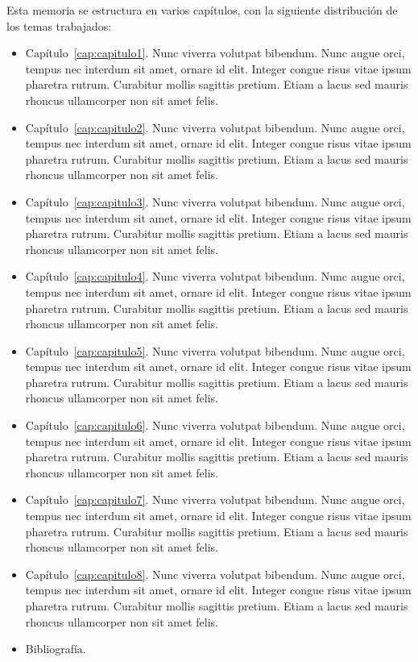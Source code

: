 Esta memoria se estructura en varios capítulos, con la siguiente distribución de los temas trabajados:

\begin{itemize}
	\item Capítulo~\ref{cap:capitulo1}. Nunc viverra volutpat bibendum. Nunc augue orci, tempus nec interdum sit amet, ornare id elit. Integer congue risus vitae ipsum pharetra rutrum. Curabitur mollis sagittis pretium. Etiam a lacus sed mauris rhoncus ullamcorper non sit amet felis.
	\item Capítulo~\ref{cap:capitulo2}. Nunc viverra volutpat bibendum. Nunc augue orci, tempus nec interdum sit amet, ornare id elit. Integer congue risus vitae ipsum pharetra rutrum. Curabitur mollis sagittis pretium. Etiam a lacus sed mauris rhoncus ullamcorper non sit amet felis.
	\item Capítulo~\ref{cap:capitulo3}. Nunc viverra volutpat bibendum. Nunc augue orci, tempus nec interdum sit amet, ornare id elit. Integer congue risus vitae ipsum pharetra rutrum. Curabitur mollis sagittis pretium. Etiam a lacus sed mauris rhoncus ullamcorper non sit amet felis.
	\item Capítulo~\ref{cap:capitulo4}. Nunc viverra volutpat bibendum. Nunc augue orci, tempus nec interdum sit amet, ornare id elit. Integer congue risus vitae ipsum pharetra rutrum. Curabitur mollis sagittis pretium. Etiam a lacus sed mauris rhoncus ullamcorper non sit amet felis.
	\item Capítulo~\ref{cap:capitulo5}. Nunc viverra volutpat bibendum. Nunc augue orci, tempus nec interdum sit amet, ornare id elit. Integer congue risus vitae ipsum pharetra rutrum. Curabitur mollis sagittis pretium. Etiam a lacus sed mauris rhoncus ullamcorper non sit amet felis.
	\item Capítulo~\ref{cap:capitulo6}. Nunc viverra volutpat bibendum. Nunc augue orci, tempus nec interdum sit amet, ornare id elit. Integer congue risus vitae ipsum pharetra rutrum. Curabitur mollis sagittis pretium. Etiam a lacus sed mauris rhoncus ullamcorper non sit amet felis.
	\item Capítulo~\ref{cap:capitulo7}. Nunc viverra volutpat bibendum. Nunc augue orci, tempus nec interdum sit amet, ornare id elit. Integer congue risus vitae ipsum pharetra rutrum. Curabitur mollis sagittis pretium. Etiam a lacus sed mauris rhoncus ullamcorper non sit amet felis.
	\item Capítulo~\ref{cap:capitulo8}. Nunc viverra volutpat bibendum. Nunc augue orci, tempus nec interdum sit amet, ornare id elit. Integer congue risus vitae ipsum pharetra rutrum. Curabitur mollis sagittis pretium. Etiam a lacus sed mauris rhoncus ullamcorper non sit amet felis.
	\item Bibliografía.
\end{itemize}
